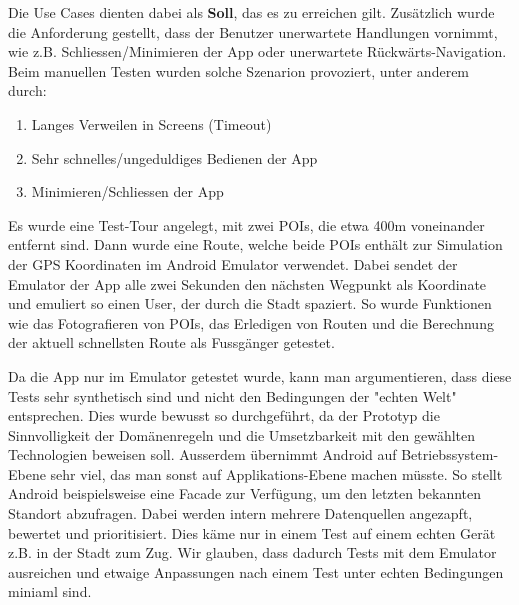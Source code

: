 Die Use Cases dienten dabei als \textbf{Soll}, das es zu erreichen gilt. Zusätzlich wurde die Anforderung
gestellt, dass der Benutzer unerwartete Handlungen vornimmt, wie z.B. Schliessen/Minimieren der App oder
unerwartete Rückwärts-Navigation. Beim manuellen Testen wurden solche Szenarion provoziert, unter anderem
durch:

\begin{enumerate}
    \item Langes Verweilen in Screens (Timeout)
    \item Sehr schnelles/ungeduldiges Bedienen der App 
    \item Minimieren/Schliessen der App
\end{enumerate}

Es wurde eine Test-Tour angelegt, mit zwei POIs, die etwa 400m voneinander entfernt sind. Dann wurde
eine Route, welche beide POIs enthält zur Simulation der GPS Koordinaten im Android Emulator verwendet.
Dabei sendet der Emulator der App alle zwei Sekunden den nächsten Wegpunkt als Koordinate und emuliert
so einen User, der durch die Stadt spaziert. So wurde Funktionen wie das Fotografieren von POIs, das
Erledigen von Routen und die Berechnung der aktuell schnellsten Route als Fussgänger getestet.

Da die App nur im Emulator getestet wurde, kann man argumentieren, dass diese Tests sehr synthetisch
sind und nicht den Bedingungen der "echten Welt" entsprechen. Dies wurde bewusst so durchgeführt, da
der Prototyp die Sinnvolligkeit der Domänenregeln und die Umsetzbarkeit mit den gewählten Technologien
beweisen soll.
Ausserdem übernimmt Android auf Betriebssystem-Ebene sehr viel, das man sonst auf Applikations-Ebene
machen müsste. So stellt Android beispielsweise eine Facade zur Verfügung, um den letzten bekannten
Standort abzufragen. Dabei werden intern mehrere Datenquellen angezapft, bewertet und prioritisiert.
Dies käme nur in einem Test auf einem echten Gerät z.B. in der Stadt zum Zug. Wir glauben, dass dadurch
Tests mit dem Emulator ausreichen und etwaige Anpassungen nach einem Test unter echten Bedingungen
miniaml sind.

